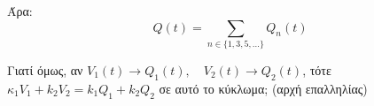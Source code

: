 \documentclass[11pt,a4paper,titlepage,draft]{article}
\begin{document}
Άρα:
\[
Q(t) = \sum_{n \in \lbrace1,3,5,\dots\rbrace}Q_n(t)
\]

Γιατί όμως, αν \(V_1(t) \rightarrow Q_1(t), \quad V_2(t) \rightarrow Q_2(t)\), τότε \(κ_1V_1+k_2V_2 = k_1Q_1 +k_2Q_2\) σε αυτό το κύκλωμα; (αρχή επαλληλίας)
\end{document}
